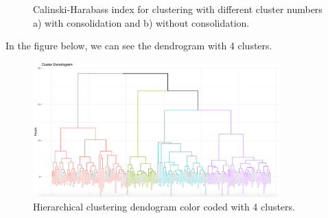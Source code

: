 \documentclass[12pt]{extarticle}
\begin{document}
\begin{figure}[H]%
    \centering
    \qquad
    \caption{Calinski-Harabass index for clustering with different cluster numbers a) with consolidation and b) without consolidation.}%
    \label{fig:example}%
\end{figure}

In the figure below, we can see the dendrogram with 4 clusters.

\begin{figure}[H]
  \centering
    \includegraphics[width=0.85\textwidth]{figures/hierchical_clustering_dendogram.png}
    \caption{Hierarchical clustering dendogram color coded with 4 clusters. \label{fig:pca_ind}}
\end{figure}
\end{document}
